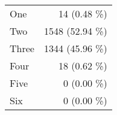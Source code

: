 \begin{tabular}{ l  r }
One & 14 (0.48 \%)\\
Two & 1548 (52.94 \%)\\
Three & 1344 (45.96 \%)\\
Four & 18 (0.62 \%)\\
Five & 0 (0.00 \%)\\
Six & 0 (0.00 \%)\\
\end{tabular}